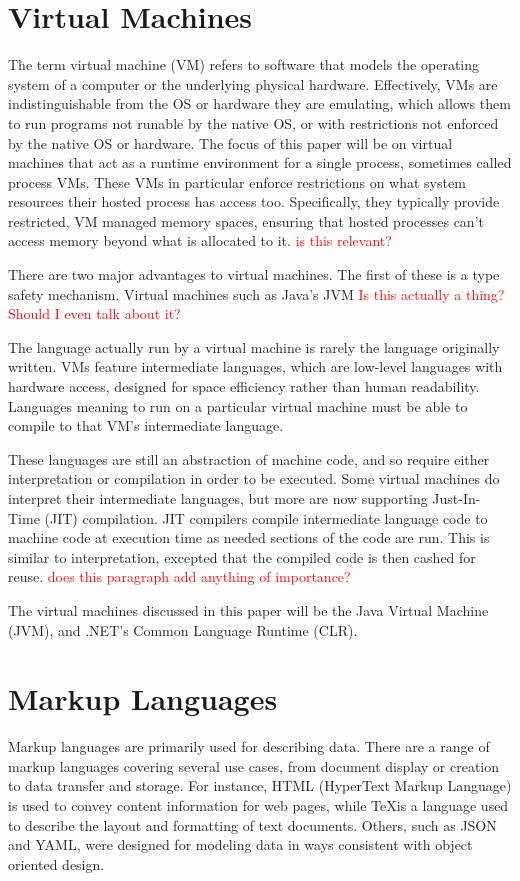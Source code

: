 \documentclass{sig-alternate}
\newcommand{\mycomment}[1]{\textcolor{red}{#1}}
\begin{document}
\section{Virtual Machines}\label{VM}


The term virtual machine (VM) refers to software that models the operating system of a computer or the underlying physical hardware. Effectively, VMs are indistinguishable from the OS or hardware they are emulating, which allows them to run programs not runable by the native OS, or with restrictions not enforced by the native OS or hardware.
The focus of this paper will be on virtual machines that act as a runtime environment for a single process, sometimes called process VMs. These VMs in particular enforce restrictions on what system resources their hosted process has access too. Specifically, they typically provide restricted, VM managed memory spaces, ensuring that hosted processes can't access memory beyond what is allocated to it.\cite{wiki:VM} \mycomment{is this relevant?}

There are two major advantages to virtual machines. The first of these is a type safety mechanism. Virtual machines such as Java's JVM \mycomment{Is this actually a thing? Should I even talk about it?}

The language actually run by a virtual machine is rarely the language originally written. VMs feature intermediate languages, which are low-level languages with hardware access, designed for space efficiency rather than human readability. Languages meaning to run on a particular virtual machine must be able to compile to that VM's intermediate language.

These languages are still an abstraction of machine code, and so require either interpretation or compilation in order to be executed. Some virtual machines do interpret their intermediate languages, but more are now supporting Just-In-Time (JIT) compilation. JIT compilers compile intermediate language code to machine code at execution time as needed sections of the code are run. This is similar to interpretation, excepted that the compiled code is then cashed for reuse.\cite{wiki:JIT} \mycomment{does this paragraph add anything of importance?}

The virtual machines discussed in this paper will be the Java Virtual Machine (JVM), and .NET's Common Language Runtime (CLR).


\section{Markup Languages}\label{ML}
Markup languages are primarily used for describing data. There are a range of markup languages covering several use cases, from document display or creation to data transfer and storage. For instance, HTML (HyperText Markup Language) is used to convey content information for web pages, while \TeX is a language used to describe the layout and formatting of text documents.
Others, such as JSON and YAML, were designed for modeling data in ways consistent with object oriented design. 
\end{document}
